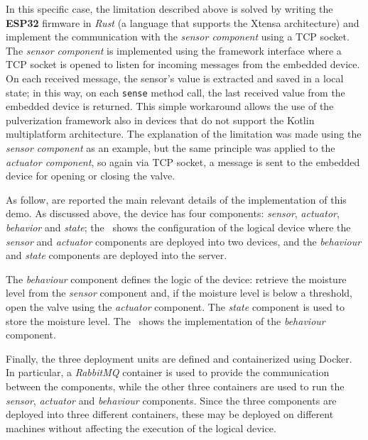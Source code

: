 In this specific case, the limitation described above is solved by writing the \textbf{ESP32} firmware in \emph{Rust} (a language that supports the
Xtensa architecture) and implement the communication with the \emph{sensor component} using a TCP socket. The \emph{sensor component} is
implemented using the framework interface where a TCP socket is opened to listen for incoming messages from the embedded device.
On each received message, the sensor's value is extracted and saved in a local state; in this way, on each \texttt{sense} method call,
the last received value from the embedded device is returned.
This simple workaround allows the use of the pulverization framework also in devices that do not support the Kotlin multiplatform architecture.
The explanation of the limitation was made using the \emph{sensor component} as an example, but the same principle was applied to the
\emph{actuator component}, so again via TCP socket, a message is sent to the embedded device for opening or closing the valve.

As follow, are reported the main relevant details of the implementation of this demo.
As discussed above, the device has four components: \emph{sensor}, \emph{actuator}, \emph{behavior} and \emph{state};
the~ shows the configuration of the logical device where the \emph{sensor} and \emph{actuator} components are
deployed into two devices, and the \emph{behaviour} and \emph{state} components are deployed into the server.



The \emph{behaviour} component defines the logic of the device: retrieve the moisture level from the \emph{sensor} component and, if the moisture level is below a threshold, open the valve using the \emph{actuator} component. The \emph{state} component is used to store the moisture level.
The~ shows the implementation of the \emph{behaviour} component.

Finally, the three deployment units are defined and containerized using Docker. In particular, a \emph{RabbitMQ} container is used to provide the
communication between the components, while the other three containers are used to run the \emph{sensor}, \emph{actuator} and \emph{behaviour}
components. Since the three components are deployed into three different containers, these may be deployed on different machines without affecting
the execution of the logical device.


